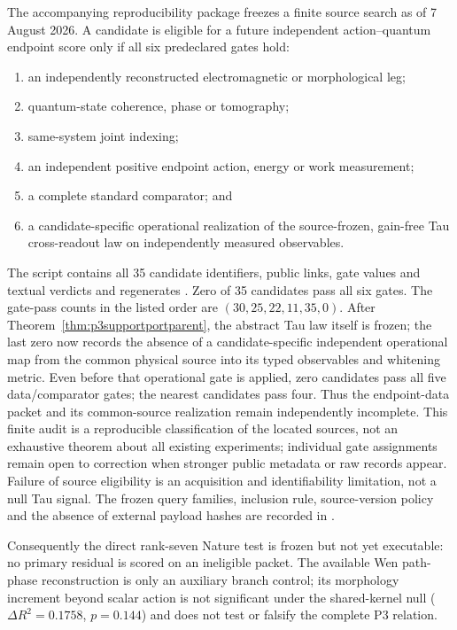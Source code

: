 \documentclass[11pt]{article}
\begin{document}
The accompanying reproducibility package freezes a finite source search as of
7 August 2026.  A candidate is eligible for a future independent
action--quantum endpoint score only if all six predeclared gates hold:
\begin{enumerate}[nosep]
\item an independently reconstructed electromagnetic or morphological leg;
\item quantum-state coherence, phase or tomography;
\item same-system joint indexing;
\item an independent positive endpoint action, energy or work measurement;
\item a complete standard comparator; and
\item a candidate-specific operational realization of the source-frozen,
gain-free Tau cross-readout law on independently measured observables.
\end{enumerate}
The script  contains all
35 candidate identifiers, public links, gate values and textual verdicts and
regenerates
.  Zero of 35
candidates pass all six gates.  The gate-pass counts in the listed order are
$(30,25,22,11,35,0)$.  After
Theorem~\ref{thm:p3supportportparent}, the abstract Tau law itself is frozen;
the last zero now records the absence of a candidate-specific independent
operational map from the common physical source into its typed observables and
whitening metric.  Even before that operational gate is applied, zero
candidates pass all five data/comparator gates; the nearest candidates pass
four.  Thus the endpoint-data packet and its common-source realization remain
independently incomplete.  This finite audit is a reproducible
classification of the located sources, not an exhaustive theorem about all
existing experiments; individual gate assignments remain open to correction
when stronger public metadata or raw records appear.  Failure of source
eligibility is an acquisition and identifiability limitation, not a null Tau
signal.  The frozen query families, inclusion rule, source-version policy and
the absence of external payload hashes are recorded in
.

Consequently the direct rank-seven Nature test is frozen but not yet
executable: no primary residual is scored on an ineligible packet.  The
available Wen path-phase reconstruction is only an auxiliary branch control;
its morphology increment beyond scalar action is not significant under the
shared-kernel null ($\Delta R^2=0.1758$, $p=0.144$) and does not test or
falsify the complete P3 relation.
\end{document}
